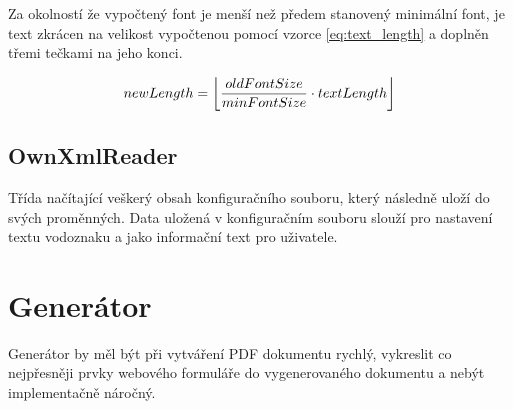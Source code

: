 Za okolností že vypočtený font je menší než předem stanovený minimální font, je text zkrácen na velikost vypočtenou pomocí vzorce  \eqref{eq:text_length} a doplněn třemi tečkami na jeho konci. 

\begin{equation}
newLength = \floor*{\frac{oldFontSize}{minFontSize} \cdot textLength} \label{eq:text_length}
\end{equation}
\subsection{OwnXmlReader}
\label{subsec:ownxml}
Třída načítající veškerý obsah konfiguračního souboru, který následně uloží do svých proměnných. Data uložená v konfiguračním souboru slouží pro nastavení textu vodoznaku a jako informační text pro uživatele.
\section{Generátor}
Generátor by měl být při vytváření PDF dokumentu rychlý, vykreslit co nejpřesněji prvky webového formuláře do vygenerovaného dokumentu a nebýt implementačně náročný.  

